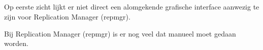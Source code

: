 \subsubsection{}
\label{subsubsec:Open source}

\subsection{}
\label{subsec:Could have}

Op eerste zicht lijkt er niet direct een alomgekende grafische interface aanwezig te zijn voor Replication Manager (repmgr).

Bij Replication Manager (repmgr) is er nog veel dat manueel moet gedaan worden.

\subsubsection{}
\label{subsubsec:Grafische interface}

\subsubsection{}
\label{subsubsec:Beperkte manuele interventie}
